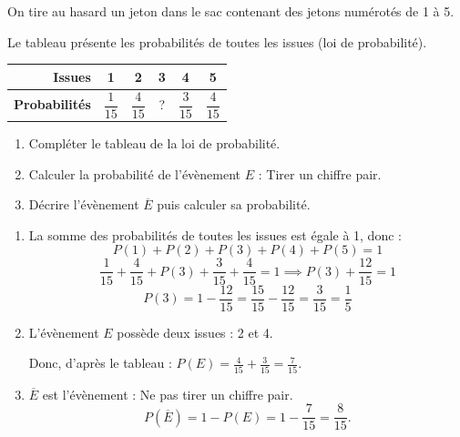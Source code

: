 \begin{methode}
	On tire au hasard un jeton dans le sac contenant des jetons numérotés de 1 à 5.

	Le tableau présente les probabilités de toutes les issues (loi de probabilité).
	\begin{center}
		\def\arraystretch{1.5}
		\begin{tabular}{|r|c|c|c|c|c|} \hline
			\textbf{Issues}                              & 1               & 2               & 3 & 4               & 5               \\ \hline
			\rule[-12pt]{0pt}{32pt}\textbf{Probabilités} & $\dfrac{1}{15}$ & $\dfrac{4}{15}$ & ? & $\dfrac{3}{15}$ & $\dfrac{4}{15}$ \\ \hline
		\end{tabular}
	\end{center}
	\begin{enumerate}[label=\alph*)]
		\item Compléter le tableau de la loi de probabilité.
		\item Calculer la probabilité de l'évènement $E$ : \og{}Tirer un chiffre pair\fg{}.
		\item Décrire l'évènement $\overline{E}$ puis calculer sa probabilité.
	\end{enumerate}
	\begin{correction}
		\begin{enumerate}[label=\alph*)]
			\item La somme des probabilités de toutes les issues est égale à 1, donc :
			      $$
				      P(1) + P(2) + P(3) + P(4) + P(5) = 1
			      $$
			      $$
				      \frac{1}{15} + \frac{4}{15} + P(3) + \frac{3}{15} + \frac{4}{15} = 1 \implies P(3) + \frac{12}{15} = 1
			      $$
			      $$
				      P(3) = 1 - \frac{12}{15} = \frac{15}{15} - \frac{12}{15} = \frac{3}{15} = \frac{1}{5}
			      $$
			\item L'évènement $E$ possède deux issues : 2 et 4.

			      Donc, d'après le tableau : $P(E) = \frac{4}{15} + \frac{3}{15} = \frac{7}{15}$.
			\item $\overline{E}$ est l'évènement : \og{}Ne pas tirer un chiffre pair\fg{}.
			      $$
				      P(\overline{E}) = 1 - P(E) = 1 - \frac{7}{15} = \frac{8}{15}.
			      $$
		\end{enumerate}
	\end{correction}
\end{methode}

